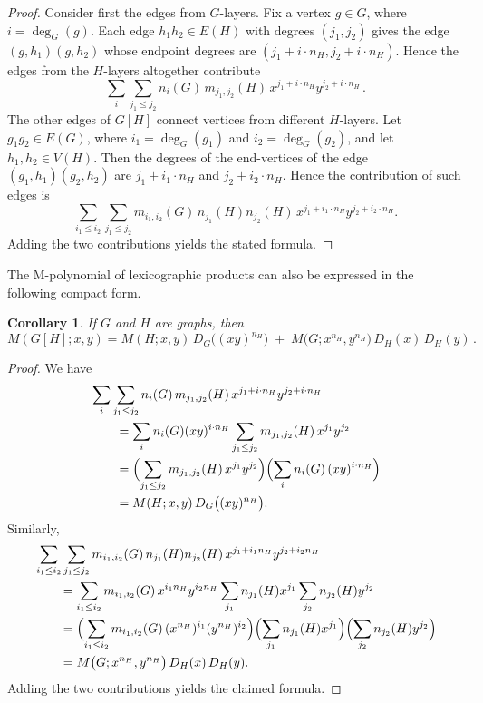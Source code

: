 \documentclass[letterpaper,12pt]{article}
\newtheorem{corollary}[theorem]{Corollary}
\begin{document}
\begin{proof}
Consider first the edges from $G$-layers. Fix a vertex $g\in G$, where $i=\deg_G(g)$.  
Each edge $h_1h_2\in E(H)$ with degrees $(j_1,j_2)$ gives the edge $(g,h_1)(g,h_2)$ whose endpoint degrees are $(j_1 + i \cdot n_H,  j_2 + i \cdot n_H)$. Hence the edges from the $H$-layers altogether contribute
\[
\sum_{i}\sum_{j_1\le j_2}
n_i(G)\,m_{j_1,j_2}(H)\,
x^{j_1+i \cdot n_H} y^{j_2+i \cdot n_H}\,.
\]
The other edges of $G[H]$ connect vertices from different $H$-layers. Let $g_1g_2\in E(G)$, where $i_1 = \deg_G(g_1)$ and $i_2 = \deg_G(g_2)$, and let $h_1, h_2\in V(H)$. Then the degrees of the end-vertices of the edge $(g_1,h_1)(g_2,h_2)$ are $j_1+i_1 \cdot n_H$ and $ j_2 + i_2 \cdot n_H$. Hence the contribution of such edges is 
\[
\sum_{i_1\le i_2}\sum_{j_1\le j_2}
m_{i_1,i_2}(G)\, n_{j_1}(H)n_{j_2}(H)\,
x^{j_1+i_1 \cdot n_H} y^{j_2+i_2 \cdot n_H}.
\]
Adding the two contributions yields the stated formula.
\end{proof}

The M-polynomial of lexicographic products can also be expressed in the following compact form. 


\begin{corollary}
\label{cor:lexico-compact}
If $G$ and $H$ are graphs, then 
\begin{equation}\label{eq:LexicographicCompact}
    M(G[H];x,y)
=
M(H;x,y)\, D_G\bigl((xy)^{n_H}\bigr)
\;+\;
M\bigl(G; x^{n_H}, y^{n_H}\bigr)\, D_H(x)\, D_H(y)\,  .
\end{equation}
\end{corollary}

\begin{proof}
We have
\[
\begin{aligned}
&\sum_{i}\sum_{j_1\le j_2}
n_i(G)\, m_{j_1,j_2}(H)\,
x^{j_1+i\cdot n_H} y^{j_2+i\cdot n_H} \\
&\qquad=
\sum_{i} n_i(G) (xy)^{i\cdot n_H}
\sum_{j_1\le j_2} m_{j_1,j_2}(H)\, x^{j_1} y^{j_2} \\
&\qquad=
\Bigl(\sum_{j_1\le j_2} m_{j_1,j_2}(H)\, x^{j_1} y^{j_2}\Bigr)
\Bigl(\sum_i n_i(G)\, (xy)^{i\cdot n_H}\Bigr) \\
&\qquad=
M(H;x,y)\, D_G\bigl((xy)^{n_H}\bigr).
\end{aligned}
\]
Similarly,
\[
\begin{aligned}
&\sum_{i_1\le i_2}\sum_{j_1\le j_2}
m_{i_1,i_2}(G)\, n_{j_1}(H)n_{j_2}(H)\,
x^{j_1+i_1 n_H} y^{j_2+i_2 n_H} \\
&\qquad=
\sum_{i_1\le i_2} m_{i_1,i_2}(G)\,
x^{i_1 n_H} y^{i_2 n_H}
\sum_{j_1} n_{j_1}(H) x^{j_1}
\sum_{j_2} n_{j_2}(H) y^{j_2} \\
&\qquad=
\Bigl(\sum_{i_1\le i_2} m_{i_1,i_2}(G)\,
(x^{n_H})^{i_1} (y^{n_H})^{i_2}\Bigr)
\Bigl(\sum_{j_1} n_{j_1}(H) x^{j_1}\Bigr)
\Bigl(\sum_{j_2} n_{j_2}(H) y^{j_2}\Bigr) \\
&\qquad=
M\bigl(G;x^{n_H},y^{n_H}\bigr)\, D_H(x)\, D_H(y).
\end{aligned}
\]
\medskip
Adding the two contributions yields the claimed formula.
\end{proof}
\end{document}
